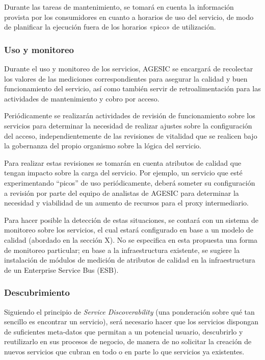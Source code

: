 \documentclass[11pt]{article}
\begin{document}
				Durante las tareas de mantenimiento, se tomará en cuenta la información provista por los consumidores en cuanto a horarios de uso del servicio, de modo de planificar la ejecución fuera de los horarios «pico» de utilización.

			\subsubsection{Uso y monitoreo}
				Durante el uso y monitoreo de los servicios, AGESIC se encargará de recolectar los valores de las mediciones correspondientes para asegurar la calidad y buen funcionamiento del servicio, así como también servir de retroalimentación para las actividades de mantenimiento y cobro por acceso.

				Periódicamente se realizarán actividades de revisión de funcionamiento sobre los servicios para determinar la necesidad de realizar ajustes sobre la configuración del acceso, independientemente de las revisiones de vitalidad que se realicen bajo la gobernanza del propio organismo sobre la lógica del servicio.

				Para realizar estas revisiones se tomarán en cuenta atributos de calidad que tengan impacto sobre la carga del servicio. Por ejemplo, un servicio que esté experimentando “picos” de uso periódicamente, deberá someter su configuración a revisión por parte del equipo de analistas de AGESIC para determinar la necesidad y viabilidad de un aumento de recursos para el proxy intermediario.

				Para hacer posible la detección de estas situaciones, se contará con un sistema de monitoreo sobre los servicios, el cual estará configurado en base a un modelo de calidad (abordado en la sección X). No se especifica en esta propuesta una forma de monitoreo particular; en base a la infraestructura existente, se sugiere la instalación de módulos de medición de atributos de calidad en la infraestructura de un Enterprise Service Bus (ESB).

			\subsubsection{Descubrimiento}
				Siguiendo el principio de \emph{Service Discoverability} (una ponderación sobre qué tan sencillo es encontrar un servicio), será necesario hacer que los servicios dispongan de suficientes meta-datos que permitan a un potencial usuario, descubrirlo y reutilizarlo en sus procesos de negocio, de manera de no solicitar la creación de nuevos servicios que cubran en todo o en parte lo que servicios ya existentes.
\end{document}
